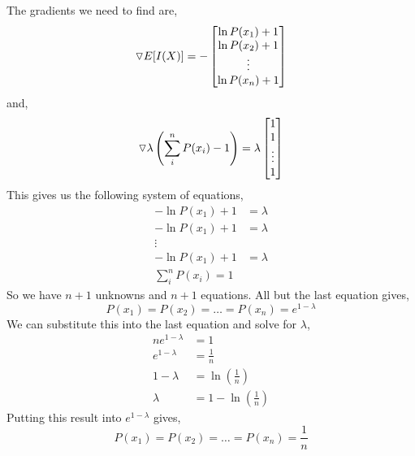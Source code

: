 \documentclass[12pt]{article}
\begin{document}
 The gradients we need to find are,
\[
\triangledown E[I(X)] = 
-
\begin{bmatrix}
\ln P(x_1) + 1 \\
\ln P(x_2) + 1 \\
\vdots \\
\ln P(x_n)  + 1
\end{bmatrix}
\]
and,
\[
\triangledown \lambda \left( \sum_{i}^{n} P(x_i) -1 \right) = 
\lambda
\begin{bmatrix}
1 \\
1 \\
\vdots \\
1
\end{bmatrix}
\]
This gives us the following system of equations,
\begin{align*}
-\ln P(x_1) + 1 &= \lambda \\
-\ln P(x_1) + 1 &= \lambda \\
\vdots \\
-\ln P(x_1) + 1 &= \lambda \\
\sum_{i}^{n} P(x_i) = 1
\end{align*}
So we have $n+1$ unknowns and $n+1$ equations. All but the last equation gives,
\[
P(x_1) = P(x_2) = \ldots = P(x_n) = e^{1-\lambda}
\]
We can substitute this into the last equation and solve for $\lambda$,
\begin{align*}
ne^{1-\lambda} &= 1 \\
e^{1-\lambda} &= \frac{1}{n} \\
1-\lambda &= \ln \left(\frac{1}{n}\right) \\
\lambda &= 1 - \ln \left(\frac{1}{n} \right)
\end{align*}
Putting this result into $e^{1-\lambda}$ gives,
\[
P(x_1)=P(x_2)=\ldots=P(x_n)=\frac{1}{n}
\]
\end{document}

